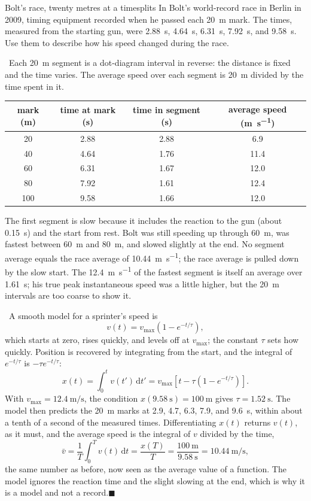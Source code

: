 \documentclass[11pt,twoside,openany]{book}
\newcommand{\dd}{\mathrm{d}}
\newcommand{\viewtag}[3]{\fcolorbox{#2}{#3}{\footnotesize\textbf{\textcolor{#2}{#1}}}}
\newcommand{\elemtag}{\viewtag{Elementary}{elemcol}{elempale}}
\newcommand{\calctag}{\viewtag{Calculus}{calccol}{calcpale}}
\newcommand{\elem}{\par\medskip\noindent\elemtag\ }
\newcommand{\calc}{\par\medskip\noindent\calctag\ }
\newcommand{\qed}{\hfill$\blacksquare$}
\begin{document}
\begin{example}{Bolt's race, twenty metres at a time}{splits}
In Bolt's world-record race in Berlin in 2009, timing equipment recorded when he passed each \SI{20}{\metre} mark. The times, measured from the starting gun, were \SI{2.88}{\second}, \SI{4.64}{\second}, \SI{6.31}{\second}, \SI{7.92}{\second}, and \SI{9.58}{\second}. Use them to describe how his speed changed during the race.

\elem Each \SI{20}{\metre} segment is a dot-diagram interval in reverse: the distance is fixed and the time varies. The average speed over each segment is \SI{20}{\metre} divided by the time spent in it.
\begin{center}
\renewcommand{\arraystretch}{1.2}
\begin{tabular}{cccc}
\toprule
mark (m) & time at mark (s) & time in segment (s) & average speed (\si{\metre\per\second}) \\
\midrule
20  & 2.88 & 2.88 & 6.9 \\
40  & 4.64 & 1.76 & 11.4 \\
60  & 6.31 & 1.67 & 12.0 \\
80  & 7.92 & 1.61 & 12.4 \\
100 & 9.58 & 1.66 & 12.0 \\
\bottomrule
\end{tabular}
\end{center}
The first segment is slow because it includes the reaction to the gun (about \SI{0.15}{\second}) and the start from rest. Bolt was still speeding up through \SI{60}{\metre}, was fastest between \SI{60}{\metre} and \SI{80}{\metre}, and slowed slightly at the end. No segment average equals the race average of \SI{10.44}{\metre\per\second}; the race average is pulled down by the slow start. The \SI{12.4}{\metre\per\second} of the fastest segment is itself an average over \SI{1.61}{\second}; his true peak instantaneous speed was a little higher, but the \SI{20}{\metre} intervals are too coarse to show it.

\calc A smooth model for a sprinter's speed is
\[
v(t) = v_{\max}\left(1 - e^{-t/\tau}\right),
\]
which starts at zero, rises quickly, and levels off at $v_{\max}$; the constant $\tau$ sets how quickly. Position is recovered by integrating from the start, and the integral of $e^{-t/\tau}$ is $-\tau e^{-t/\tau}$:
\[
x(t) = \int_0^{t} v(t')\,\dd t' = v_{\max}\left[t - \tau\left(1 - e^{-t/\tau}\right)\right].
\]
With $v_{\max} = \SI{12.4}{\metre\per\second}$, the condition $x(\SI{9.58}{\second}) = \SI{100}{\metre}$ gives $\tau = \SI{1.52}{\second}$. The model then predicts the \SI{20}{\metre} marks at \num{2.9}, \num{4.7}, \num{6.3}, \num{7.9}, and \SI{9.6}{\second}, within about a tenth of a second of the measured times. Differentiating $x(t)$ returns $v(t)$, as it must, and the average speed is the integral of $v$ divided by the time,
\[
\bar v = \frac{1}{T}\int_0^{T} v(t)\,\dd t = \frac{x(T)}{T} = \frac{\SI{100}{\metre}}{\SI{9.58}{\second}} = \SI{10.44}{\metre\per\second},
\]
the same number as before, now seen as the average value of a function. The model ignores the reaction time and the slight slowing at the end, which is why it is a model and not a record.\qed
\end{example}
\end{document}
